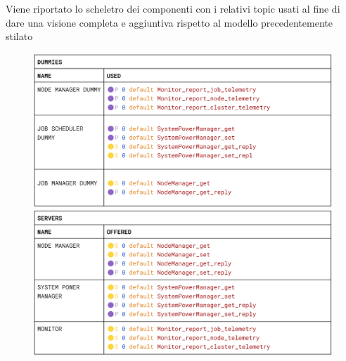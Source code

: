 Viene riportato lo scheletro dei componenti con i relativi topic usati al fine di dare una visione completa e aggiuntiva rispetto al modello precedentemente stilato  
\begin{figure}[H]
    \centering
    \includegraphics[width=\textwidth]{./img/dummies_skeleton.png}
    \includegraphics[width=\textwidth]{./img/server_skeleton.png}
\end{figure}